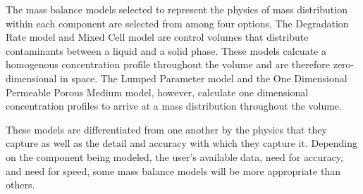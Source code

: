 The mass balance models selected to represent the physics of mass distribution 
within each component are selected from among four options. The Degradation Rate 
model and Mixed Cell model are control volumes that distribute contaminants 
between a liquid and a solid phase. These models calcuate a homogenous 
concentration profile throughout the volume and are therefore
zero-dimensional in space. The Lumped Parameter model and the One Dimensional 
Permeable Porous Medium model, however, calculate one dimensional concentration 
profiles to arrive at a mass distribution throughout the volume. 

These models are differentiated from one another by the physics that they 
capture as well as the detail and accuracy with which they capture it.  
Depending on the component being modeled, the user's available data, need for 
accuracy, and need for speed, some mass balance models will be more appropriate 
than others.  

